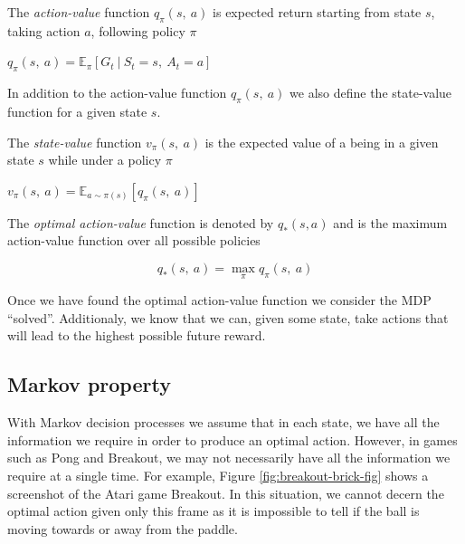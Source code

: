 \begin{defn}
	\label{action-value-func}
	The \textit{action-value} function $q_\pi(s,~a)$ is expected return starting from state $s$, taking action $a$, following policy $\pi$
	\begin{center}
		$q_\pi(s,~a)=\mathbb{E}_\pi[G_t~|~S_t=s,~A_t=a]$
	\end{center}
\end{defn}

\noindent In addition to the action-value function $q_\pi(s,~a)$ we also define the state-value function for a given state $s$.

\begin{defn}
	\label{state-value-func}
	The \textit{state-value} function $v_\pi(s,~a)$ is the expected value of a being in a given state $s$ while under a policy $\pi$

	\begin{center}
		$v_\pi(s,~a) = \mathbb{E}_{a\sim \pi(s)}\left[q_\pi(s,~a)\right]$
	\end{center}
\end{defn}

\begin{defn}
	The \textit{optimal action-value} function is denoted by $q_*(s, a)$ and is the maximum action-value function over all possible policies
	\vspace*{-7mm}
	\begin{center}
		$$q_*(s,~a)=\max_\pi q_\pi(s,~a)$$
	\end{center}
\end{defn}

Once we have found the optimal action-value function we consider the MDP ``solved''. Additionaly, we know that we can, given some state, take actions that will lead to the highest possible future reward.

\subsection{Markov property}
\label{dsgn:sec:markov-prop}
With Markov decision processes we assume that in each state, we have all the information we require in order to produce an optimal action. However, in games such as Pong and Breakout, we may not necessarily have all the information we require at a single time. For example, Figure \ref{fig:breakout-brick-fig} shows a screenshot of the Atari game Breakout. In this situation, we cannot decern the optimal action given only this frame as it is impossible to tell if the ball is moving towards or away from the paddle.

